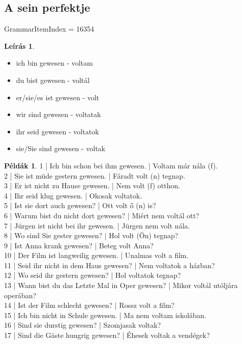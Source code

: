 \documentclass{article}
\theoremstyle{definition}
\newtheorem*{exmp}{Példák}
\newtheorem*{desc}{Leírás}
\begin{document}
\subsection{A sein perfektje}

GrammarItemIndex = 16354

\begin{desc}
\begin{itemize}
\item ich bin gewesen - voltam
\item du bist gewesen - voltál
\item er/sie/es ist gewesen - volt
\item wir sind gewesen - voltatak
\item ihr seid gewesen - voltatok
\item sie/Sie sind gewesen - voltak
\end{itemize}
\end{desc}

\begin{exmp}
1 | Ich bin schon bei ihm gewesen. | Voltam már nála (f).\\
2 | Sie ist müde gestern gewesen. | Fáradt volt (n) tegnap.\\
3 | Er ist nicht zu Hause gewesen. | Nem volt (f) otthon.\\
4 | Ihr seid klug gewesen. | Okosak voltatok.\\
5 | Ist sie dort auch gewesen? | Ott volt ő (n) is?\\
6 | Warum bist du nicht dort gewesen? | Miért nem voltál ott?\\
7 | Jürgen ist nicht bei ihr gewesen. | Jürgen nem volt nála.\\
8 | Wo sind Sie gester gewesen? | Hol volt (Ön) tegnap?\\
9 | Ist Anna krank gewesen? | Beteg volt Anna?\\
10 | Der Film ist langweilig gewesen. | Unalmas volt a film.\\
11 | Seid ihr nicht in dem Haus gewesen? | Nem voltatok a házban?\\
12 | Wo seid ihr gestern gewesen? | Hol voltatok tegnap?\\
13 | Wann bist du das Letzte Mal in Oper gewesen? | Mikor voltál utóljára operában?\\
14 | Ist der Film schlecht gewesen? | Rossz volt a film?\\
15 | Ich bin nicht in Schule gewesen. | Ma nem voltam iskolában.\\
16 | Sind sie durstig gewesen? | Szomjasak voltak?\\
17 | Sind die Gäste hungrig gewesen? | Éhesek voltak a vendégek?\\
\end{exmp}
\end{document}
